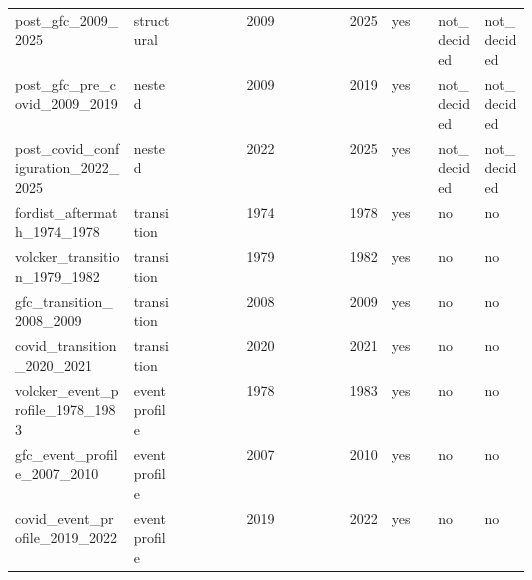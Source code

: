 \documentclass[11pt]{article}
\begin{document}
\begin{center}
\begin{longtable}{p{0.23\linewidth}p{0.10\linewidth}rrp{0.09\linewidth}p{0.09\linewidth}p{0.09\linewidth}}
post\_\allowbreak{}gfc\_\allowbreak{}2009\_\allowbreak{}2025 & structural & 2009 & 2025 & yes & not\_\allowbreak{}decided & not\_\allowbreak{}decided \\
post\_\allowbreak{}gfc\_\allowbreak{}pre\_\allowbreak{}covid\_\allowbreak{}2009\_\allowbreak{}2019 & nested & 2009 & 2019 & yes & not\_\allowbreak{}decided & not\_\allowbreak{}decided \\
post\_\allowbreak{}covid\_\allowbreak{}configuration\_\allowbreak{}2022\_\allowbreak{}2025 & nested & 2022 & 2025 & yes & not\_\allowbreak{}decided & not\_\allowbreak{}decided \\
fordist\_\allowbreak{}aftermath\_\allowbreak{}1974\_\allowbreak{}1978 & transition & 1974 & 1978 & yes & no & no \\
volcker\_\allowbreak{}transition\_\allowbreak{}1979\_\allowbreak{}1982 & transition & 1979 & 1982 & yes & no & no \\
gfc\_\allowbreak{}transition\_\allowbreak{}2008\_\allowbreak{}2009 & transition & 2008 & 2009 & yes & no & no \\
covid\_\allowbreak{}transition\_\allowbreak{}2020\_\allowbreak{}2021 & transition & 2020 & 2021 & yes & no & no \\
volcker\_\allowbreak{}event\_\allowbreak{}profile\_\allowbreak{}1978\_\allowbreak{}1983 & event profile & 1978 & 1983 & yes & no & no \\
gfc\_\allowbreak{}event\_\allowbreak{}profile\_\allowbreak{}2007\_\allowbreak{}2010 & event profile & 2007 & 2010 & yes & no & no \\
covid\_\allowbreak{}event\_\allowbreak{}profile\_\allowbreak{}2019\_\allowbreak{}2022 & event profile & 2019 & 2022 & yes & no & no \\
\bottomrule
\end{longtable}
\normalsize
\end{center}
\end{document}
